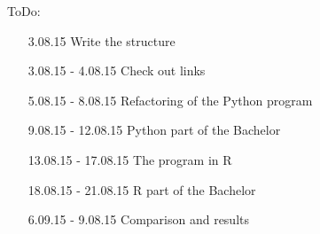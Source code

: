 \documentclass{article}
\begin{document}
ToDo:
\begin{enumerate}
    \item[3.08.15] Write the structure
    \item[3.08.15 - 4.08.15] Check out links
    \item[5.08.15 - 8.08.15] Refactoring of the Python program
    \item[9.08.15 - 12.08.15] Python part of the Bachelor
    \item[13.08.15 - 17.08.15] The program in R
    \item[18.08.15 - 21.08.15] R part of the Bachelor
    \item[6.09.15 - 9.08.15] Comparison and results
\end{enumerate}
\end{document}
